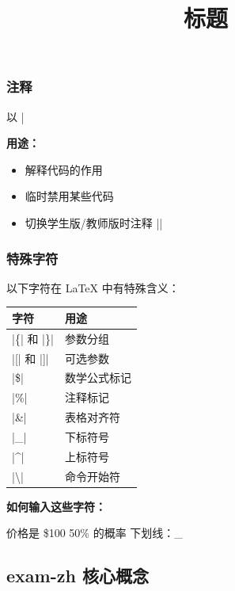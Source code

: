 \subsubsection{注释}

以 |%

\begin{latexcode}
  \title{标题}  %
\end{latexcode}

\textbf{用途：}
\begin{itemize}
  \item 解释代码的作用
  \item 临时禁用某些代码
  \item 切换学生版/教师版时注释 |\examsetup|
\end{itemize}

\subsubsection{特殊字符}

以下字符在 \LaTeX{} 中有特殊含义：

\begin{center}
\begin{tabular}{ll}
  \textbf{字符} & \textbf{用途} \\
  \hline
  |\{| 和 |\}| & 参数分组 \\
  |[| 和 |]| & 可选参数 \\
  |\$| & 数学公式标记 \\
  |\%| & 注释标记 \\
  |\&| & 表格对齐符 \\
  |\_| & 下标符号 \\
  |\textasciicircum| & 上标符号 \\
  |\textbackslash| & 命令开始符 \\
\end{tabular}
\end{center}

\textbf{如何输入这些字符：}
\begin{latexcode}
  价格是 \$100        %
  50\% 的概率         %
  下划线：\_          %
\end{latexcode}


\subsection{exam-zh 核心概念}


